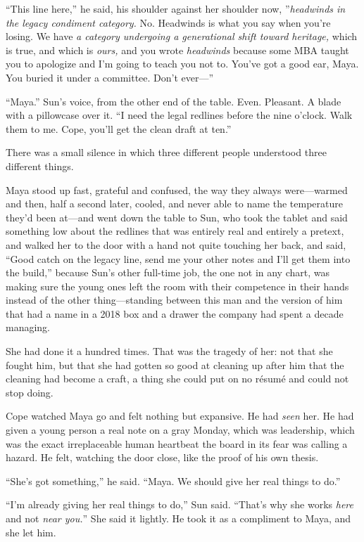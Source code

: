 \documentclass[11pt,openany]{book}
\begin{document}
``This line here,'' he said, his shoulder against her shoulder now, ''\textit{headwinds in the legacy condiment category.} No. Headwinds is what you say when you're losing. We have \textit{a category undergoing a generational shift toward heritage,} which is true, and which is \textit{ours,} and you wrote \textit{headwinds} because some MBA taught you to apologize and I'm going to teach you not to. You've got a good ear, Maya. You buried it under a committee. Don't ever---''

``Maya.'' Sun's voice, from the other end of the table. Even. Pleasant. A blade with a pillowcase over it. ``I need the legal redlines before the nine o'clock. Walk them to me. Cope, you'll get the clean draft at ten.''

There was a small silence in which three different people understood three different things.

Maya stood up fast, grateful and confused, the way they always were---warmed and then, half a second later, cooled, and never able to name the temperature they'd been at---and went down the table to Sun, who took the tablet and said something low about the redlines that was entirely real and entirely a pretext, and walked her to the door with a hand not quite touching her back, and said, ``Good catch on the legacy line, send me your other notes and I'll get them into the build,'' because Sun's other full-time job, the one not in any chart, was making sure the young ones left the room with their competence in their hands instead of the other thing---standing between this man and the version of him that had a name in a 2018 box and a drawer the company had spent a decade managing.

She had done it a hundred times. That was the tragedy of her: not that she fought him, but that she had gotten so good at cleaning up after him that the cleaning had become a craft, a thing she could put on no résumé and could not stop doing.

Cope watched Maya go and felt nothing but expansive. He had \textit{seen} her. He had given a young person a real note on a gray Monday, which was leadership, which was the exact irreplaceable human heartbeat the board in its fear was calling a hazard. He felt, watching the door close, like the proof of his own thesis.

``She's got something,'' he said. ``Maya. We should give her real things to do.''

``I'm already giving her real things to do,'' Sun said. ``That's why she works \textit{here} and not \textit{near you.}'' She said it lightly. He took it as a compliment to Maya, and she let him.
\end{document}

